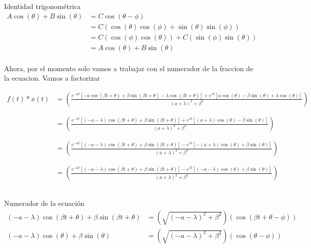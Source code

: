 \documentclass[10pt]{article}
\begin{document}
\newpage
\begin{example}{Identidad trigonométrica}
\begin{equation*} 
\begin{split}
A\cos(\theta) + B\sin(\theta)& = C\cos(\theta - \phi)\\
& = C(\cos(\theta)\cos(\phi) + \sin(\theta)\sin(\phi))\\
& = C(\cos(\phi)\cos(\theta)) + C(\sin(\phi)\sin(\theta))\\
& = A\cos(\theta) + B\sin(\theta)\\
\end{split}
\end{equation*}
\end{example}


Ahora, por el momento solo vamos a trabajar con el numerador de la fraccion de la ecuacion. Vamos a factorizar

\begin{equation*} 
\begin{split}
f(t)*x(t) & = \left( \frac{e^{-at}[-a\cos(\beta t+\theta)+\beta\sin(\beta t +\theta)-\lambda\cos(\beta t +\theta)]+e^{\lambda t}[a\cos(\theta)-\beta\sin(\theta)+\lambda\cos(\theta)]}{(a+\lambda)^{2}+\beta^{2}}\right) \\ \\ \\
& = \left( \frac{e^{-at}[(-a-\lambda)\cos(\beta t + \theta)+\beta\sin(\beta t + \theta)]+e^{\lambda t}[(a+\lambda)\cos(\theta) - \beta\sin(\theta)]}{(a+\lambda)^{2}+\beta^{2}}\right)\\ \\ \\
& = \left( \frac{e^{-at}[(-a-\lambda)\cos(\beta t + \theta)+\beta\sin(\beta t + \theta)]-e^{\lambda t}[-(a+\lambda)\cos(\theta) + \beta\sin(\theta)]}{(a+\lambda)^{2}+\beta^{2}}\right)\\ \\ \\
& = \left( \frac{e^{-at}[(-a-\lambda)\cos(\beta t + \theta)+\beta\sin(\beta t + \theta)]-e^{\lambda t}[(-a-\lambda)\cos(\theta) + \beta\sin(\theta)]}{(a+\lambda)^{2}+\beta^{2}}\right)\\ \\ \\
\end{split}
\end{equation*}


\begin{example}{Numerador de la ecuación}
\begin{equation*} 
\begin{split}
(-a-\lambda)\cos(\beta t + \theta) + \beta\sin(\beta t + \theta)& = (\sqrt{(-a-\lambda)^{2}+\beta^{2}})(\cos(\beta t + \theta - \phi))\\
(-a-\lambda)\cos(\theta) + \beta\sin(\theta)& = (\sqrt{(-a-\lambda)^{2}+\beta^{2}})(\cos(\theta - \phi))\\
\end{split}
\end{equation*}
\end{example}
\end{document}
